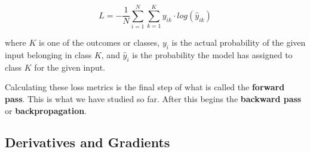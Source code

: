 \begin{flushleft}
    $$ L = -\frac{1}{N}\sum^{N}_{i=1} \sum^{K}_{k=1} y_{ik} \cdot log(\hat{y}_{ik})$$
    
    where $K$ is one of the outcomes or classes, $y_i$ is the actual probability of the given input belonging in class $K$, and $\hat{y}_i$ is the probability the model has assigned to class $K$ for the given input. \break
    
    Calculating these loss metrics is the final step of what is called the \textbf{forward pass}. This is what we have studied so far. After this begins the \textbf{backward pass} or \textbf{backpropagation}. 
\end{flushleft}

\subsection{Derivatives and Gradients}
